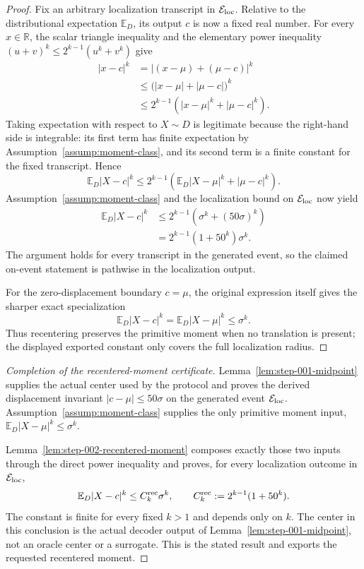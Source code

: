 \begin{proof}
Fix an arbitrary localization transcript in
\(\mathcal E_{\rm loc}\). Relative to the distributional expectation
\(\mathbb E_D\), its output \(c\) is now a fixed real number. For every
\(x\in\mathbb R\), the scalar triangle inequality and the elementary power
inequality \((u+v)^k\leq2^{k-1}(u^k+v^k)\) give
\[
\begin{aligned}
\lvert x-c\rvert^k
&=\lvert (x-\mu)+(\mu-c)\rvert^k\\
&\leq\bigl(\lvert x-\mu\rvert+\lvert\mu-c\rvert\bigr)^k\\
&\leq2^{k-1}\left(
    \lvert x-\mu\rvert^k+\lvert\mu-c\rvert^k
  \right).
\end{aligned}
\]
Taking expectation with respect to \(X\sim D\) is legitimate because the
right-hand side is integrable: its first term has finite expectation by
Assumption~\ref{assump:moment-class}, and its second term is a finite
constant for the fixed transcript. Hence
\[
\mathbb E_D\lvert X-c\rvert^k
\leq2^{k-1}\left(
  \mathbb E_D\lvert X-\mu\rvert^k+\lvert\mu-c\rvert^k
\right).
\]
Assumption~\ref{assump:moment-class} and the localization bound on
\(\mathcal E_{\rm loc}\) now yield
\[
\begin{aligned}
\mathbb E_D\lvert X-c\rvert^k
&\leq2^{k-1}\left(\sigma^k+(50\sigma)^k\right)\\
&=2^{k-1}(1+50^k)\sigma^k.
\end{aligned}
\]
The argument holds for every transcript in the generated event, so the claimed
on-event statement is pathwise in the localization output.

For the zero-displacement boundary \(c=\mu\), the original expression itself
gives the sharper exact specialization
\[
\mathbb E_D\lvert X-c\rvert^k
=\mathbb E_D\lvert X-\mu\rvert^k
\leq\sigma^k.
\]
Thus recentering preserves the primitive moment when no translation is present;
the displayed exported constant only covers the full localization radius.
\end{proof}

\begin{proof}[Completion of the recentered-moment certificate]
Lemma~\ref{lem:step-001-midpoint} supplies the actual center used
by the protocol and proves the derived displacement invariant
\(\lvert c-\mu\rvert\leq50\sigma\) on the generated event
\(\mathcal E_{\rm loc}\). Assumption~\ref{assump:moment-class} supplies the
only primitive moment input,
\(\mathbb E_D\lvert X-\mu\rvert^k\leq\sigma^k\).

Lemma~\ref{lem:step-002-recentered-moment} composes exactly those two
inputs through the direct power inequality and proves, for every localization
outcome in \(\mathcal E_{\rm loc}\),
\[
\mathbb E_D\lvert X-c\rvert^k
\leq C_k^{\rm rec}\sigma^k,
\qquad
C_k^{\rm rec}:=2^{k-1}(1+50^k).
\]
The constant is finite for every fixed \(k>1\) and depends only on \(k\). The
center in this conclusion is the actual decoder output of
Lemma~\ref{lem:step-001-midpoint}, not an
oracle center or a surrogate. This is the stated result and
exports the requested recentered moment.
\end{proof}

